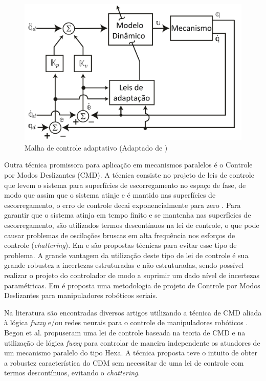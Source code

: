 \documentclass[]{politex}
\begin{document}
\begin{figure}[h]
	\centering
	\includegraphics[scale=0.385]{../figures/CA.jpg}  
	\caption{Malha de controle adaptativo (Adaptado de \cite{Craig})}
	\label{fig:CTCp}
\end{figure}

Outra técnica promissora para aplicação em mecanismos paralelos é o Controle por Modos Deslizantes (CMD). A técnica consiste no projeto de leis de controle que levem o sistema para superfícies de escorregamento no espaço de fase, de modo que assim que o sistema atinje e é mantido nas superfícies de escorregamento, o erro de controle decai exponencialmente para zero \cite{Slotini}. Para garantir que o sistema atinja em tempo finito e se mantenha nas superfícies de escorregamento, são utilizados termos descontínuos na lei de controle, o que pode causar problemas de oscilações bruscas em alta frequência nos esforços de controle ({\em chattering}). Em \cite{Guldner}  e  \cite{Utkin2} são propostas técnicas para evitar esse tipo de problema. A grande vantagem da utilização deste tipo de lei de controle é sua grande robustez a incertezas estruturadas e não estruturadas, sendo possível realizar o projeto do controlador de modo a suprimir um dado nível de incertezas paramétricas. Em \cite{SlotiniSMC} é proposta uma metodologia de projeto de Controle por Modos Deslizantes para manipuladores robóticos seriais.

Na literatura são encontradas diversos artigos utilizando a técnica de CMD aliada à lógica {\em fuzzy} e/ou redes neurais para o controle de manipuladores robóticos \cite{Begon, Ertugrul, Hu, Sadati}. Begon et al. \cite{Begon} propuseram uma lei de controle baseada na teoria de CMD e na utilização de lógica {\em fuzzy} para controlar de maneira independente os atuadores de um mecanismo paralelo do tipo Hexa. A técnica proposta teve o intuito de obter a robustez característica do CDM sem necessitar de uma lei de controle com termos descontínuos, evitando o {\em chattering}.
\end{document}
